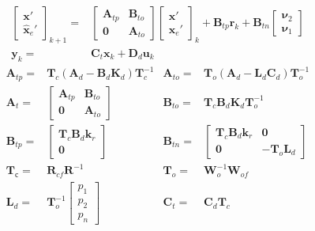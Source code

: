 \documentclass[twocolumn]{autart}    %
\newcommand{\mat}[1]{\boldsymbol{#1}}
\renewcommand{\vec}[1]{\boldsymbol{#1}}
\begin{document}
\begin{align}
\label{eq:observer_LTI_cf}
\left [\begin{array}{c}\vec{x}'\\ \hat{\vec{x}}_e' \end{array}\right]_{k+1}
=&\left [\begin{array}{cc}\mat{A}_{tp}&\mat{B}_{to}\\ \mat{0}&\mat{A}_{to}\end{array}\right]
\left [\begin{array}{c}\vec{x}'\\ \hat{\vec{x}}_e' \end{array}\right]_k
+\mat{B}_{tp} \vec{r}_k
+\mat{B}_{tn}\left [\begin{array}{c}\vec{\nu}_2\\ \vec{\nu}_1\end{array}\right]\\
\vec{y}_k=&\mat{C}_{t}\vec{x}_k + \mat{D}_{d}\vec{u}_k\nonumber
\end{align}
\begin{align*}
\mat{A}_{tp}=&\mat{T}_c\left(\mat{A}_d-\mat{B}_d\mat{K}_d\right)\mat{T}_c^{-1}&
\mat{A}_{to}=&\mat{T}_o\left(\mat{A}_d-\mat{L}_d\mat{C}_d\right)\mat{T}_o^{-1}\\
\mat{A}_t=&\left [\begin{array}{cc}\mat{A}_{tp}&\mat{B}_{to}\\ \mat{0}&\mat{A}_{to}\end{array}\right]&
\mat{B}_{to}=&\mat{T}_c\mat{B}_d\mat{K}_d\mat{T}_o^{-1}\\
\mat{B}_{tp}=&\left[\begin{array}{c}\mat{T}_c\mat{B}_d\mat{k}_r\\\mat{0}\end{array}\right]&
\mat{B}_{tn}=&\left[\begin{array}{cc}\mat{T}_c\mat{B}_d\mat{k}_r&\mat{0}\\\mat{0}&-\mat{T}_o\mat{L}_d\end{array}\right]\\
\mat{T}_с=&\mat{R}_{cf}\mat{R}^{-1}&
\mat{T}_o=&\mat{W}_o^{-1}\mat{W}_{of}\\
\mat{L}_d=& \mat{T}_o^{-1}\left[ \begin{array}{c}p_1\\p_2\\p_n\end{array}\right]&
\mat{C}_t=&\mat{C}_d\mat{T}_c
\end{align*}
\end{document}
